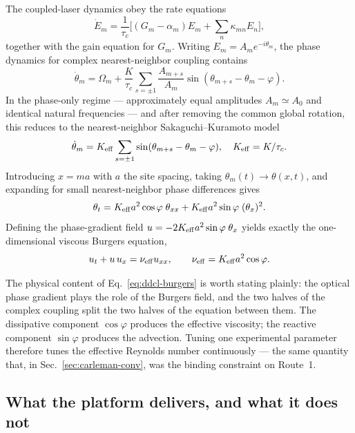 \documentclass[aps,prx,twocolumn,notitlepage,superscriptaddress,floatfix,10pt]{revtex4-2}
\begin{document}
The coupled-laser dynamics obey the rate equations
\begin{equation}
\dot E_m=\frac{1}{\tau_c}\Big[(G_m-\alpha_m)E_m+\sum_n\kappa_{mn}E_n\Big],
\end{equation}
together with the gain equation for $G_m$. Writing $E_m=A_me^{-i\theta_m}$, the phase dynamics for
complex nearest-neighbor coupling contains
\begin{equation}
\dot\theta_m=\Omega_m+\frac{K}{\tau_c}\sum_{s=\pm1}\frac{A_{m+s}}{A_m}\sin(\theta_{m+s}-\theta_m-\varphi).
\end{equation}
In the phase-only regime --- approximately equal amplitudes $A_m\simeq A_0$ and identical natural
frequencies --- and after removing the common global rotation, this reduces to the nearest-neighbor
Sakaguchi--Kuramoto model
\begin{equation}
\dot\theta_m=K_{\rm eff}\sum_{s=\pm1}\sin(\theta_{m+s}-\theta_m-\varphi),
\quad K_{\rm eff}=K/\tau_c .
\end{equation}
Introducing $x=ma$ with $a$ the site spacing, taking $\theta_m(t)\to\theta(x,t)$, and expanding for
small nearest-neighbor phase differences gives
\begin{equation}
\theta_t=K_{\rm eff}a^2\cos\varphi\;\theta_{xx}+K_{\rm eff}a^2\sin\varphi\;(\theta_x)^2 .
\end{equation}
Defining the phase-gradient field $u=-2K_{\rm eff}a^2\sin\varphi\;\theta_x$ yields exactly the
one-dimensional viscous Burgers equation,
\begin{equation}
u_t+u\,u_x=\nu_{\rm eff}u_{xx},\qquad \nu_{\rm eff}=K_{\rm eff}a^2\cos\varphi .
\label{eq:ddcl-burgers}
\end{equation}

The physical content of Eq.~\eqref{eq:ddcl-burgers} is worth stating plainly: the optical phase
gradient plays the role of the Burgers field, and the two halves of the complex coupling split the two
halves of the equation between them. The dissipative component $\cos\varphi$ produces the effective
viscosity; the reactive component $\sin\varphi$ produces the advection. Tuning one experimental
parameter therefore tunes the effective Reynolds number continuously --- the same quantity that,
in Sec.~\ref{sec:carleman-conv}, was the binding constraint on Route~1.

\subsection{What the platform delivers, and what it does not}
\end{document}
